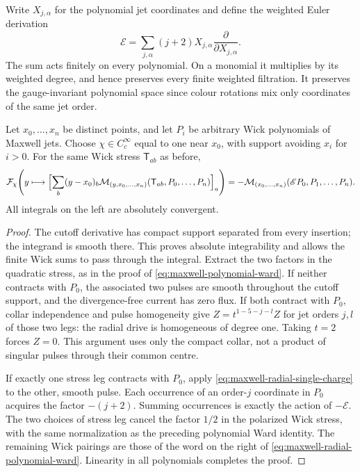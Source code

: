 Write $X_{j,\alpha}$ for the polynomial jet coordinates and define the
weighted Euler derivation
\[
 \mathscr E=\sum_{j,\alpha}(j+2)X_{j,\alpha}
                         \frac{\partial}{\partial X_{j,\alpha}}.
\]
The sum acts finitely on every polynomial. On a monomial it multiplies
by its weighted degree, and hence preserves every finite weighted
filtration. It preserves the gauge-invariant polynomial space since
colour rotations mix only coordinates of the same jet order.

\begin{proposition}
\label{prop:maxwell-radial-ward}
Let $x_0,\ldots,x_n$ be distinct points, and let $P_i$ be arbitrary
Wick polynomials of Maxwell jets. Choose $\chi\in C_c^\infty$ equal
to one near $x_0$, with support avoiding $x_i$ for $i>0$. For the
same Wick stress $\mathsf T_{ab}$ as before,
\begin{equation}\label{eq:maxwell-radial-polynomial-ward}
 \mathcal F_\chi\!\left(
   y\longmapsto\Bigl[\sum_b(y-x_0)_b
       \mathcal M_{(y,x_0,\ldots,x_n)}
          (\mathsf T_{ab},P_0,\ldots,P_n)\Bigr]_a\right)
 =-\mathcal M_{(x_0,\ldots,x_n)}
                (\mathscr E P_0,P_1,\ldots,P_n).
\end{equation}
All integrals on the left are absolutely convergent.
\end{proposition}

\begin{proof}
The cutoff derivative has compact support separated from every insertion;
the integrand is smooth there. This proves absolute integrability and
allows the finite Wick sums to pass through the integral. Extract the
two factors in the quadratic stress, as in the proof of
\eqref{eq:maxwell-polynomial-ward}. If neither contracts with $P_0$,
the associated two pulses are smooth throughout the cutoff support,
and the divergence-free current has zero flux. If both contract with
$P_0$, collar independence and pulse homogeneity give
$Z=t^{1-5-j-l}Z$ for jet orders $j,l$ of those two legs: the radial
drive is homogeneous of degree one. Taking $t=2$ forces $Z=0$.
This argument uses only the compact collar, not a product of singular
pulses through their common centre.

If exactly one stress leg contracts with $P_0$, apply
\eqref{eq:maxwell-radial-single-charge} to the other, smooth pulse.
Each occurrence of an order-$j$ coordinate in $P_0$ acquires the factor
$-(j+2)$. Summing occurrences is exactly the action of $-\mathscr E$.
The two choices of stress leg cancel the factor $1/2$ in the polarized
Wick stress, with the same normalization as the preceding polynomial
Ward identity. The remaining Wick pairings are those of the word on
the right of \eqref{eq:maxwell-radial-polynomial-ward}. Linearity in
all polynomials completes the proof.
\end{proof}

